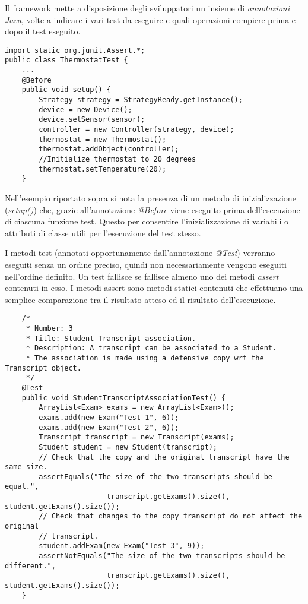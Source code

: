 Il framework mette a disposizione degli sviluppatori un insieme di \emph{annotazioni Java}, volte a indicare i vari test da eseguire e quali operazioni compiere prima e dopo il test eseguito.

\begin{lstlisting}
import static org.junit.Assert.*;
public class ThermostatTest {
	...		
	@Before
	public void setup() {
		Strategy strategy = StrategyReady.getInstance();
		device = new Device();
		device.setSensor(sensor);
		controller = new Controller(strategy, device);	
		thermostat = new Thermostat();
		thermostat.addObject(controller);
		//Initialize thermostat to 20 degrees
		thermostat.setTemperature(20);
	}
\end{lstlisting}

Nell'esempio riportato sopra si nota la presenza di un metodo di inizializzazione (\emph{setup()}) che, grazie all'annotazione \emph{@Before} viene eseguito prima dell'esecuzione di ciascuna funzione test. Questo per consentire l'inizializzazione di variabili o attributi di classe utili per l'esecuzione del test stesso.

I metodi test (annotati opportunamente dall'annotazione \emph{@Test}) verranno eseguiti senza un ordine preciso, quindi non necessariamente vengono eseguiti nell'ordine definito. Un test fallisce se fallisce almeno uno dei metodi \emph{assert} contenuti in esso. I metodi assert sono metodi statici contenuti che effettuano una semplice comparazione tra il risultato atteso ed il risultato dell'esecuzione. 

\begin{lstlisting}
	/*
	 * Number: 3
	 * Title: Student-Transcript association.
	 * Description: A transcript can be associated to a Student. 
	 * The association is made using a defensive copy wrt the Transcript object.
	 */
	@Test
	public void StudentTranscriptAssociationTest() {		
		ArrayList<Exam> exams = new ArrayList<Exam>();
		exams.add(new Exam("Test 1", 6));
		exams.add(new Exam("Test 2", 6));		
		Transcript transcript = new Transcript(exams);		
		Student student = new Student(transcript);		
		// Check that the copy and the original transcript have the same size.
		assertEquals("The size of the two transcripts should be equal.", 
						transcript.getExams().size(), student.getExams().size());		
		// Check that changes to the copy transcript do not affect the original 
		// transcript.
		student.addExam(new Exam("Test 3", 9));
		assertNotEquals("The size of the two transcripts should be different.", 
						transcript.getExams().size(), student.getExams().size());		
	}
\end{lstlisting}

